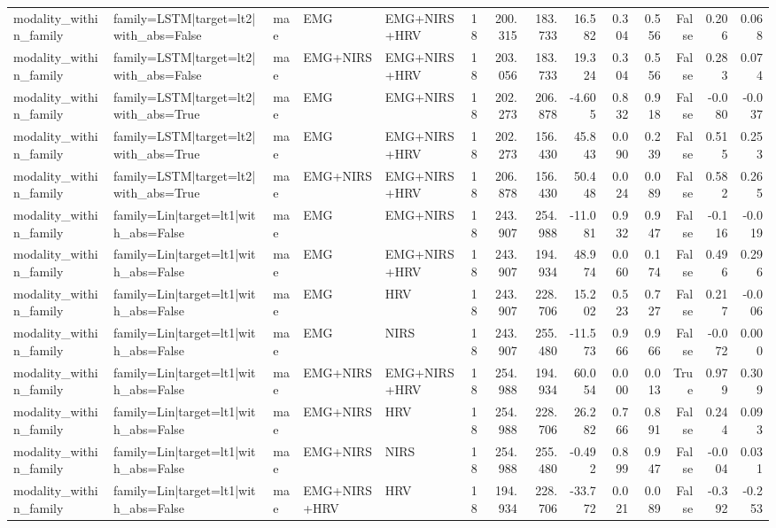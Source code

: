 \begin{table}
\begin{tabular}{lllllrrrrrrrrr}
modality_within_family & family=LSTM|target=lt2|with_abs=False & mae & EMG & EMG+NIRS+HRV & 18 & 200.315 & 183.733 & 16.582 & 0.304 & 0.556 & False & 0.206 & 0.068 \\
modality_within_family & family=LSTM|target=lt2|with_abs=False & mae & EMG+NIRS & EMG+NIRS+HRV & 18 & 203.056 & 183.733 & 19.324 & 0.304 & 0.556 & False & 0.283 & 0.074 \\
modality_within_family & family=LSTM|target=lt2|with_abs=True & mae & EMG & EMG+NIRS & 18 & 202.273 & 206.878 & -4.605 & 0.832 & 0.918 & False & -0.080 & -0.037 \\
modality_within_family & family=LSTM|target=lt2|with_abs=True & mae & EMG & EMG+NIRS+HRV & 18 & 202.273 & 156.430 & 45.843 & 0.090 & 0.239 & False & 0.515 & 0.253 \\
modality_within_family & family=LSTM|target=lt2|with_abs=True & mae & EMG+NIRS & EMG+NIRS+HRV & 18 & 206.878 & 156.430 & 50.448 & 0.024 & 0.089 & False & 0.582 & 0.265 \\
modality_within_family & family=Lin|target=lt1|with_abs=False & mae & EMG & EMG+NIRS & 18 & 243.907 & 254.988 & -11.081 & 0.932 & 0.947 & False & -0.116 & -0.019 \\
modality_within_family & family=Lin|target=lt1|with_abs=False & mae & EMG & EMG+NIRS+HRV & 18 & 243.907 & 194.934 & 48.974 & 0.060 & 0.174 & False & 0.496 & 0.296 \\
modality_within_family & family=Lin|target=lt1|with_abs=False & mae & EMG & HRV & 18 & 243.907 & 228.706 & 15.202 & 0.523 & 0.727 & False & 0.217 & -0.006 \\
modality_within_family & family=Lin|target=lt1|with_abs=False & mae & EMG & NIRS & 18 & 243.907 & 255.480 & -11.573 & 0.966 & 0.966 & False & -0.072 & 0.000 \\
modality_within_family & family=Lin|target=lt1|with_abs=False & mae & EMG+NIRS & EMG+NIRS+HRV & 18 & 254.988 & 194.934 & 60.054 & 0.000 & 0.013 & True & 0.979 & 0.309 \\
modality_within_family & family=Lin|target=lt1|with_abs=False & mae & EMG+NIRS & HRV & 18 & 254.988 & 228.706 & 26.282 & 0.766 & 0.891 & False & 0.244 & 0.093 \\
modality_within_family & family=Lin|target=lt1|with_abs=False & mae & EMG+NIRS & NIRS & 18 & 254.988 & 255.480 & -0.492 & 0.899 & 0.947 & False & -0.004 & 0.031 \\
modality_within_family & family=Lin|target=lt1|with_abs=False & mae & EMG+NIRS+HRV & HRV & 18 & 194.934 & 228.706 & -33.772 & 0.021 & 0.089 & False & -0.392 & -0.253 \\

\end{tabular}
\end{table}
